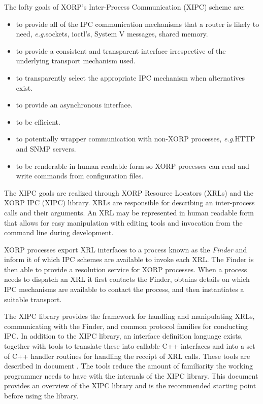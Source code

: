 \documentclass[11pt]{article}
\newcommand{\eg}{\emph{e.g.\/}} %
\begin{document}
The lofty goals of XORP's Inter-Process Communication (XIPC) scheme are:

\begin{itemize}

\item to provide all of the IPC communication mechanisms that a router is
likely to need, \eg sockets, ioctl's, System V messages, shared memory.

\item to provide a consistent and transparent interface irrespective
of the underlying transport mechanism used.

\item to transparently select the appropriate IPC mechanism when
alternatives exist.

\item to provide an asynchronous interface.

\item to be efficient.

\item to potentially wrapper communication with non-XORP processes,
\eg HTTP and SNMP servers.

\item to be renderable in human readable form so XORP processes can
read and write commands from configuration files.

\end{itemize}

The XIPC goals are realized through XORP Resource Locators (XRLs) and
the XORP IPC (XIPC) library.  XRLs are responsible for describing an
inter-process calls and their arguments.  An XRL may be represented in
human readable form that allows for easy manipulation with editing
tools and invocation from the command line during development.

XORP processes export XRL interfaces to a process known as the {\em
Finder} and inform it of which IPC schemes are available to invoke
each XRL.  The Finder is then able to provide a resolution service for
XORP processes.  When a process needs to dispatch an XRL it first
contacts the Finder, obtains details on which IPC mechanisms are
available to contact the process, and then instantiates
a suitable transport.

The XIPC library provides the framework for handling and manipulating
XRLs, communicating with the Finder, and common protocol families for
conducting IPC.  In addition to the XIPC library, an interface
definition language exists, together with tools to translate these
into callable C++ interfaces and into a set of C++ handler routines
for handling the receipt of XRL calls.  These tools are described in
document \cite{xorp:xrl_interfaces}.  The tools reduce the amount of
familiarity the working programmer needs to have with the internals of
the XIPC library.  This document provides an overview of the XIPC
library and is the recommended starting point before using the
library.
\end{document}
